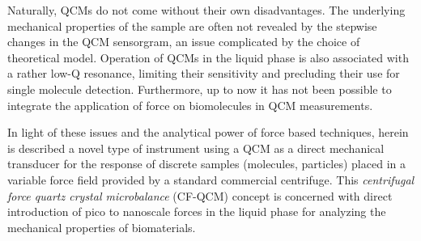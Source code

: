 Naturally, QCMs do not come without their own disadvantages. The underlying
mechanical properties of the sample are often not revealed by the stepwise
changes in the QCM sensorgram, an issue complicated by the choice of
theoretical model.  Operation of QCMs in the liquid phase is also
associated with a rather low-Q resonance, limiting their sensitivity and
precluding their use for single molecule detection.  Furthermore, up to now
it has not been possible to integrate the application of force on
biomolecules in QCM measurements.

In light of these issues and the analytical power of force based
techniques, herein is described a novel type of instrument using a QCM as a
direct mechanical transducer for the response of discrete samples
(molecules, particles) placed in a variable force field provided by a
standard commercial centrifuge.  This \textit{centrifugal force quartz
crystal microbalance} (CF-QCM) concept is concerned with direct
introduction of pico to nanoscale forces in the liquid phase for analyzing
the mechanical properties of biomaterials.

